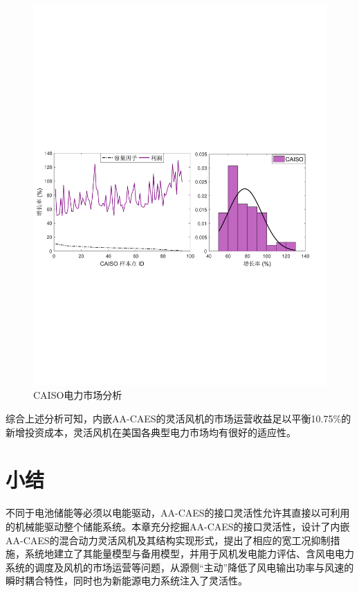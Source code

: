\begin{figure}[H] %
  \centering
  \includegraphics[scale=0.70]{figures/Chap5-21-CA-WT-Eco-CAISO.pdf}
  \caption{CAISO电力市场分析}
  \label{fig:CA-WT-Eco-CAISO}
\end{figure}



综合上述分析可知，内嵌AA-CAES的灵活风机的市场运营收益足以平衡10.75\%的新增投资成本，灵活风机在美国各典型电力市场均有很好的适应性。

\section{小结}
不同于电池储能等必须以电能驱动，AA-CAES的接口灵活性允许其直接以可利用的机械能驱动整个储能系统。本章充分挖掘AA-CAES的接口灵活性，设计了内嵌AA-CAES的混合动力灵活风机及其结构实现形式，提出了相应的宽工况抑制措施，系统地建立了其能量模型与备用模型，并用于风机发电能力评估、含风电电力系统的调度及风机的市场运营等问题，从源侧“主动”降低了风电输出功率与风速的瞬时耦合特性，同时也为新能源电力系统注入了灵活性。
